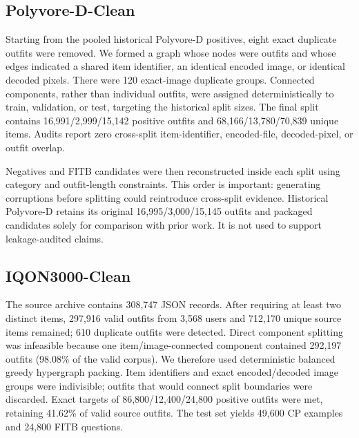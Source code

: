 \documentclass[pdflatex,sn-mathphys-num,iicol]{sn-jnl}
\begin{document}
\subsection{Polyvore-D-Clean}

Starting from the pooled historical Polyvore-D positives, eight exact duplicate outfits were removed. We formed a graph whose nodes were outfits and whose edges indicated a shared item identifier, an identical encoded image, or identical decoded pixels. There were 120 exact-image duplicate groups. Connected components, rather than individual outfits, were assigned deterministically to train, validation, or test, targeting the historical split sizes. The final split contains 16,991/2,999/15,142 positive outfits and 68,166/13,780/70,839 unique items. Audits report zero cross-split item-identifier, encoded-file, decoded-pixel, or outfit overlap.

Negatives and FITB candidates were then reconstructed inside each split using category and outfit-length constraints. This order is important: generating corruptions before splitting could reintroduce cross-split evidence. Historical Polyvore-D retains its original 16,995/3,000/15,145 outfits and packaged candidates solely for comparison with prior work. It is not used to support leakage-audited claims.

\subsection{IQON3000-Clean}

The source archive contains 308,747 JSON records. After requiring at least two distinct items, 297,916 valid outfits from 3,568 users and 712,170 unique source items remained; 610 duplicate outfits were detected. Direct component splitting was infeasible because one item/image-connected component contained 292,197 outfits (98.08\% of the valid corpus). We therefore used deterministic balanced greedy hypergraph packing. Item identifiers and exact encoded/decoded image groups were indivisible; outfits that would connect split boundaries were discarded. Exact targets of 86,800/12,400/24,800 positive outfits were met, retaining 41.62\% of valid source outfits. The test set yields 49,600 CP examples and 24,800 FITB questions.
\end{document}
